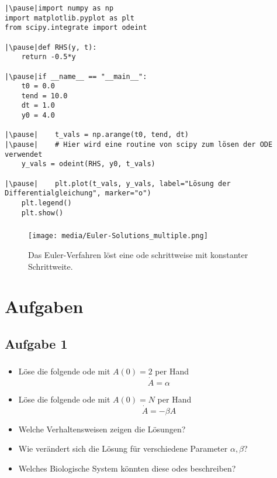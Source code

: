 \begin{frame}[fragile]
    \frametitle{\insertsubsection}
    \begin{verbatim}
|\pause|import numpy as np
import matplotlib.pyplot as plt
from scipy.integrate import odeint

|\pause|def RHS(y, t):
    return -0.5*y

|\pause|if __name__ == "__main__":
    t0 = 0.0
    tend = 10.0
    dt = 1.0
    y0 = 4.0

|\pause|    t_vals = np.arange(t0, tend, dt)
|\pause|    # Hier wird eine routine von scipy zum lösen der ODE verwendet
    y_vals = odeint(RHS, y0, t_vals)

|\pause|    plt.plot(t_vals, y_vals, label="Lösung der Differentialgleichung", marker="o")
    plt.legend()
    plt.show()
	\end{verbatim}
\end{frame}


\begin{frame}
    \frametitle{\insertsubsection}
    \begin{figure}
        \centering
        \texttt{[image: media/Euler-Solutions\_multiple.png]}
        \caption{Das Euler-Verfahren löst eine \ac{ode} schrittweise mit konstanter Schrittweite.}
    \end{figure}
\end{frame}


\section{Aufgaben}
\subsection{Aufgabe 1}
\label{subsec:exercise-1}
\begin{frame}
    \frametitle{\insertsubsection}
    \begin{itemize}[<+->]
        \item Löse die folgende \ac{ode} mit $A(0)=2$ per Hand
        \[\dot{A} = \alpha\]
        \item Löse die folgende \ac{ode} mit $A(0)=N$ per Hand
        \[\dot{A} = - \beta A\]
        \item Welche Verhaltensweisen zeigen die Lösungen?
        \item Wie verändert sich die Lösung für verschiedene Parameter $\alpha, \beta$?
        \item Welches Biologische System könnten diese \acp{ode} beschreiben?
    \end{itemize}
\end{frame}


